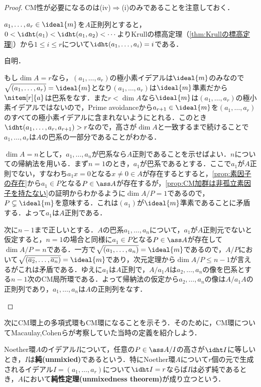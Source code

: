 \begin{proof}	
	CM性が必要になるのは(iv)$\Longrightarrow$(i)のみであることを注意しておく．
	\begin{eqv}[4]
		\item 
		$a_1,\dots,a_r\in\ideal{m}$を$A$正則列とすると，$0<\idht(a_1)<\idht(a_1,a_2)<\cdots$よりKrullの標高定理（\ref{thm:Krullの標高定理}）から$1\leq i\leq r$について$\idht (a_1,\dots,a_i)=i$である．
		\item 自明．
		\item もし$\dim A=r$なら，$(a_1,\dots,a_r)$の極小素イデアルは$\ideal{m}$のみなので$\sqrt{(a_1,\dots,a_r)}=\ideal{m}$となり$(a_1,\dots,a_r)$は$\ideal{m}$準素だから$\nitem[r]{a}$は巴系をなす．また$r<\dim A$なら$\ideal{m}$は$(a_1,\dots,a_r)$の極小素イデアルではないので，Prime avoidanceから$a_{r+1}\in\ideal{m}$を$(a_1,\dots,a_r)$のすべての極小素イデアルに含まれないようにとれる．このとき$\idht(a_1,\dots,a_r,a_{r+1})>r$なので，高さが$\dim A$と一致するまで続けることで$a_1,\dots,a_r$は$A$の巴系の一部分であることがわかる．
		\item $\dim A=n$として，$a_1,\dots,a_n$が巴系なら$A$正則であることを示せばよい．$n$についての帰納法を用いる．まず$n=1$のとき，$a_1$が巴系であるとする．ここで$a_1$が$A$正則でない，すなわち$a_1x=0$となる$x\neq0\in A$が存在するとすると，\ref{prop:素因子の存在}から$a_1\in P$となる$P\in\ass A$が存在するが，\ref{prop:CM加群は非孤立素因子を持たない}の証明からわかるように$\dim A/P=1$であるので，$P\subsetneq\ideal{m}$を意味する．これは$(a_1)$が$\ideal{m}$準素であることに矛盾する．よって$a_1$は$A$正則である．
		
		次に$n-1$まで正しいとする．$A$の巴系$a_1,\dots,a_n$について，$a_1$が$A$正則元でないと仮定すると，$n=1$の場合と同様に$a_1\in P$となる$P\in\ass A$が存在して$\dim A/P=n$である．一方で$\sqrt{(a_1,\dots,a_n)}=\ideal{m}$であるので，$A/P$において$\sqrt{(\bar{a_2},\dots,\bar{a_n})}=\ideal{m}$であり，次元定理から$\dim A/P\leq n-1$が言えるがこれは矛盾である．ゆえに$a_1$は$A$正則で，$A/a_1A$は$a_2,\dots,a_n$の像を巴系とする$n-1$次のCM局所環である．よって帰納法の仮定から$a_2,\dots,a_n$の像は$A/a_1A$の正則列であり，$a_1,\dots,a_n$は$A$の正則列をなす．
	\end{eqv}
\end{proof}

次にCM環上の多項式環もCM環になることを示そう．そのために，CM環についてMacaulay,Cohenらが考察していた当時の定義を紹介しよう．

\begin{defi}[純性定理]
	Noether環$A$のイデアル$I$について，任意の$P\in\ass A/I$の高さが$\idht I$に等しいとき，$I$は\textbf{純(unmixied)}であるという．特にNoether環$A$について$r$個の元で生成されるイデアル$I=(a_1,\dots,a_r)$について$\idht I=r$ならば$I$は必ず純であるとき，$A$において\textbf{純性定理(unmixedness theorem)}が成り立つという．
\end{defi}

